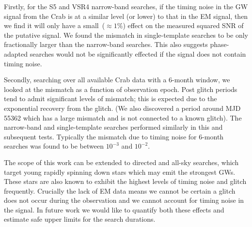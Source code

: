 \documentclass[../full_thesis/full_thesis.tex]{subfiles}
\begin{document}
Firstly, for the S5 and VSR4 narrow-band searches, if the timing noise in the
GW signal from the Crab is at a similar level (or lower) to that in the EM
signal, then we find it will only have a small~($\approx1\%$) effect on the
measured squared SNR of the putative signal.  We found the mismatch in
single-template searches to be only fractionally larger than the narrow-band
searches.  This also suggests phase-adapted searches would not be significantly
effected if the signal does not contain timing noise.

Secondly, searching over all available Crab data with a 6-month window, we
looked at the mismatch as a function of observation epoch. Post glitch periods
tend to admit significant levels of mismatch; this is expected due to the
exponential recovery from the glitch. (We also discovered a period around MJD
55362 which has a large mismatch and is not connected to a known glitch). The
narrow-band and single-template searches performed similarly in this and
subsequent tests. Typically the mismatch due to timing noise for 6-month
searches was found to be between $10^{-3}$ and $10^{-2}$.

The scope of this work can be extended to  directed and all-sky searches, which
target young rapidly spinning down stars which may emit the strongest GWs.
These stars are also known to exhibit the highest levels of timing noise and
glitch frequently. Crucially the lack of EM data means we cannot be certain a
glitch does not occur during the observation and we cannot account for timing
noise in the signal.  In future work we would like to quantify both these
effects and estimate safe upper limits for the search durations.


\biblio
\end{document}
